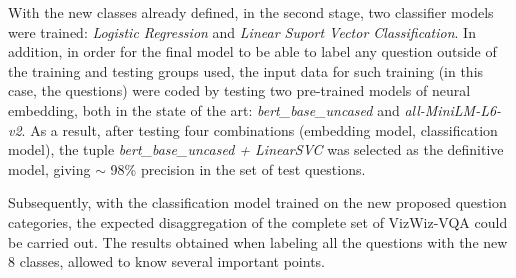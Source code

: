 With the new classes already defined, in the second stage, two classifier models were trained: \emph{Logistic Regression} and \emph{Linear Suport Vector Classification}. In addition, in order for the final model to be able to label any question outside of the training and testing groups used, the input data for such training (in this case, the questions) were coded by testing two pre-trained models of neural embedding, both in the state of the art: \emph{bert\_base\_uncased} and \emph{all-MiniLM-L6-v2}. As a result, after testing four combinations (embedding model, classification model), the tuple \emph{bert\_base\_uncased + LinearSVC} was selected as the definitive model, giving $\sim$ 98\% precision in the set of test questions.

Subsequently, with the classification model trained on the new proposed question categories, the expected disaggregation of the complete set of VizWiz-VQA could be carried out. The results obtained when labeling all the questions with the new 8 classes, allowed to know several important points.

